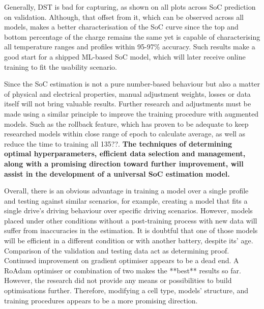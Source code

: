 Generally, DST is bad for capturing, as shown on all plots across SoC prediction on validation.
Although, that offset from it, which can be observed across all models, makes a better characterisation of the SoC curve since the top and bottom percentage of the charge remains the same yet is capable of characterising all temperature ranges and profiles within 95-97\% accuracy.
Such results make a good start for a shipped ML-based SoC model, which will later receive online training to fit the usability scenario.

%
%
Since the SoC estimation is not a pure number-based behaviour but also a matter of physical and electrical properties, manual adjustment weights, losses or data itself will not bring valuable results.
Further research and adjustments must be made using a similar principle to improve the training procedure with augmented models. 
Such as the rollback feature, which has proven to be adequate to keep researched models within close range of epoch to calculate average, as well as reduce the time to training all 135??.
\textbf{The techniques of determining optimal hyperparameters, efficient data selection and management, along with a promising direction toward further improvement, will assist in the development of a universal SoC estimation model.}

Overall, there is an obvious advantage in training a model over a single profile and testing against similar scenarios, for example, creating a model that fits a single drive's driving behaviour over specific driving scenarios.
However, models placed under other conditions without a post-training process with new data will suffer from inaccuracies in the estimation.
It is doubtful that one of those models will be efficient in a different condition or with another battery, despite its' age.
Comparison of the validation and testing data act as determining proof.
%
Continued improvement on gradient optimiser appears to be a dead end.
A RoAdam optimiser or combination of two makes the **best** results so far.
However, the research did not provide any means or possibilities to build optimisations further.
Therefore, modifying a cell type, models' structure, and training procedures appears to be a more promising direction.
